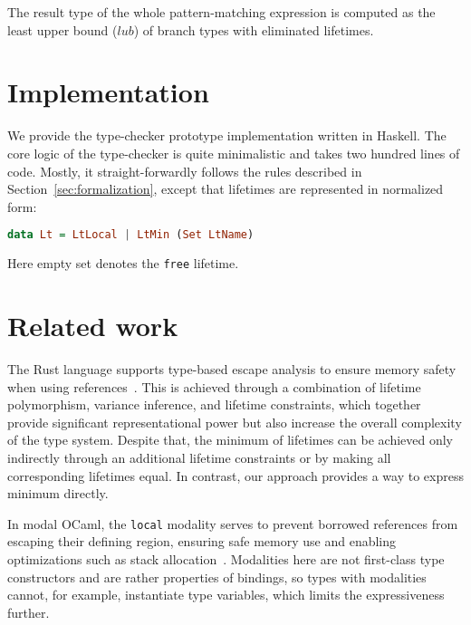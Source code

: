 \documentclass[11pt]{article}
\begin{document}
    The result type of the whole pattern-matching expression is computed as the least upper bound ($lub$) of branch types with eliminated lifetimes.


    \section{Implementation} \label{sec:implementation}

    We provide the type-checker prototype implementation written in Haskell.
    The core logic of the type-checker is quite minimalistic and takes two hundred lines of code.
    Mostly, it straight-forwardly follows the rules described in Section~\ref{sec:formalization}, except that lifetimes are represented in normalized form:
    \begin{lstlisting}[language=Haskell]
        data Lt = LtLocal | LtMin (Set LtName)
    \end{lstlisting}
    Here empty set denotes the \lstinline[language=Haskell]{free} lifetime.



    \section{Related work} \label{sec:related-work}


    The Rust language supports type-based escape analysis to ensure memory safety when using references~\cite{matsakis2014rust}.
    This is achieved through a combination of lifetime polymorphism, variance inference, and lifetime constraints, which together provide significant representational power but also increase the overall complexity of the type system.
    Despite that, the minimum of lifetimes can be achieved only indirectly through an additional lifetime constraints or by making all corresponding lifetimes equal.
    In contrast, our approach provides a way to express minimum directly.

    In modal OCaml, the \texttt{local} modality serves to prevent borrowed references from escaping their defining region, ensuring safe memory use and enabling optimizations such as stack allocation~\cite{lorenzen2024oxidizing}.
    Modalities here are not first-class type constructors and are rather properties of bindings, so types with modalities cannot, for example, instantiate type variables, which limits the expressiveness further.
\end{document}

